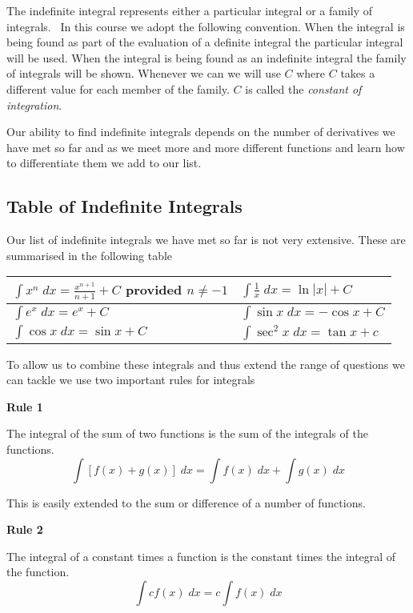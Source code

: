 The indefinite integral represents either a particular integral or a family of integrals.
\ In this course we adopt the following convention. When the integral
is being found as part of the evaluation of a definite integral the particular integral will be used. When
the integral is being found as an indefinite integral the family of integrals will be shown. Whenever
we can we will use $C$ where $C$ takes a different value for each member of the family. $C$ is called the \emph{constant of integration}. 

Our ability to find indefinite integrals
depends on the number of derivatives we have met so far and as we meet more and more different functions and learn how to differentiate them we add to our
list. 

\subsection{Table of Indefinite Integrals}
Our list of indefinite integrals we have met so far is not very extensive. These are summarised in
the following table 

\bigskip \qquad \qquad
\begin{tabular}[c]{|l|l|}\hline
$\int x^{n}\; d x =\frac{x^{n +1}}{n +1} +C$ provided $n \neq  -1$  & $\int \frac{1}{x}\; d x =\ln  \left \vert x\right \vert  +C$  \\
\hline
$\int e^{x}\; d x =e^{x} +C$  & $\int \sin  x\; d x = -\cos  x +C$  \\
\hline
$\int \cos  x\; d x =\sin  x +C$  & $\int \sec ^{2} x\; d x =\tan  x +c$  \\
\hline
\end{tabular}

To allow us to combine these integrals and thus extend the range of questions we can tackle we use two important rules for integrals 

\textbf{Rule 1} 

The integral of the sum of two functions is the sum of the integrals of the functions.
\begin{equation*}\int \left [f (x) +g (x)\right ]\; d x =\int f (x)\; d x +\int g (x)\; d x
\end{equation*}

This is easily extended to the sum or difference of a number of functions. 

\textbf{Rule
2} 

The integral of a constant times a function is the constant times the integral of the function.
\begin{equation*}\int c f (x)\; d x =c \int f (x)\; d x
\end{equation*}

